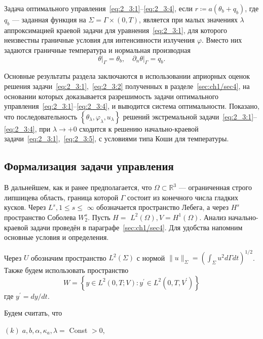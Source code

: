 Задача оптимального управления~\eqref{eq:2_3:1}--\eqref{eq:2_3:4},
если $r \coloneqq a\left(\theta_{b}+q_{b}\right)$,
где $q_{b}$ — заданная функция на $\Sigma =\Gamma \times(0, T)$,
является при малых значениях $\lambda$ аппроксимацией краевой
задачи для уравнения~\eqref{eq:2_3:1},
для которого неизвестны граничные условия для интенсивности излучения $\varphi$.
Вместо них задаются граничные температура и нормальная производная
\begin{equation}
    \label{eq:2_3:5}
    \left.\theta\right|_{\Gamma}=\theta_{b},
    \left.\quad \partial_{n} \theta\right|_{\Gamma}=q_{b}.
\end{equation}

Основные результаты раздела заключаются в использовании априорных
оценок решения задачи~\eqref{eq:2_3:1},~\eqref{eq:2_3:2} полученных
в разделе~\ref{sec:ch1/sec4},
на основании которых доказывается разрешимость задачи
оптимального управления~\eqref{eq:2_3:1}--\eqref{eq:2_3:4},
и выводится система оптимальности.
Показано, что последовательность
$\left\{\theta_{\lambda}, \varphi_{\lambda}, u_{\lambda}\right\}$
решений экстремальной задачи~\eqref{eq:2_3:1}--\eqref{eq:2_3:4},
при $ \lambda \rightarrow+0$
сходится к решению начально-краевой задачи~\eqref{eq:2_3:1},~\eqref{eq:2_3:5},
с условиями типа Коши для температуры.

\subsection{Формализация задачи управления}\label{subsec:ch2/sec3/formalization}
В дальнейшем, как и ранее предполагается,
что $\Omega \subset \mathbb{R}^{3}$ — ограниченная строго липшицева область,
граница которой $\Gamma$ состоит из конечного числа гладких кусков.
Через $L^{s}, 1 \leq s \leq$ $\infty$
обозначается пространство Лебега, а через $H^{s}$
пространство Соболева $W_{2}^{s}$.
Пусть $H=$ $L^{2}(\Omega), V=H^{1}(\Omega)$.
Анализ начально-краевой задачи проведён в параграфе~\ref{sec:ch1/sec4}.
Для удобства напомним основные условия и определения.

Через $U$ обозначим пространство $L^{2}(\Sigma)$ с нормой
$ \|u\|_{\Sigma}=\left(\int_{\Sigma} u^{2} d \Gamma d t\right)^{1 / 2}$.
Также будем использовать пространство
\[
    W=\left\{y \in L^{2}(0, T ; V):y^{\prime}
    \in L^{2}\left(0, T, V^{\prime}\right)\right\}
\]
где $y^{\prime}=d y / d t$.

Будем считать, что

$(k)\; a, b, \alpha, \kappa_{a}, \lambda=$ Const $>0$,

